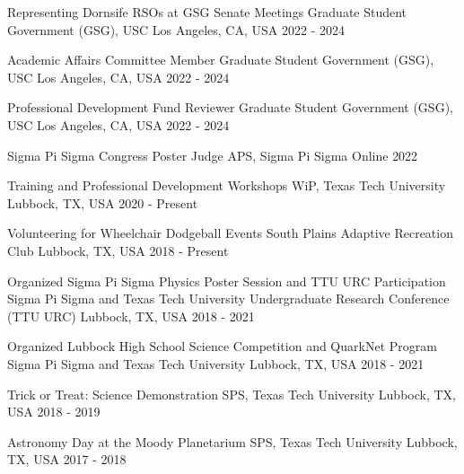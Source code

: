\begin{cvhonors}
    \cvhonor
    {Representing Dornsife RSOs at GSG Senate Meetings}
    {Graduate Student Government (GSG), USC}
    {Los Angeles, CA, USA}
    {2022 - 2024}

    \cvhonor
    {Academic Affairs Committee Member}
    {Graduate Student Government (GSG), USC}
    {Los Angeles, CA, USA}
    {2022 - 2024}

    \cvhonor
    {Professional Development Fund Reviewer}
    {Graduate Student Government (GSG), USC}
    {Los Angeles, CA, USA}
    {2022 - 2024}

    \cvhonor
    {Sigma Pi Sigma Congress Poster Judge}
    {APS, Sigma Pi Sigma}
    {Online}
    {2022}

    \cvhonor
    {Training and Professional Development Workshops}
    {WiP, Texas Tech University}
    {Lubbock, TX, USA}
    {2020 - Present}

    \cvhonor
    {Volunteering for Wheelchair Dodgeball Events}
    {South Plains Adaptive Recreation Club}
    {Lubbock, TX, USA}
    {2018 - Present}

    \cvhonor
    {Organized Sigma Pi Sigma Physics Poster Session and TTU URC Participation}
    {Sigma Pi Sigma and Texas Tech University Undergraduate Research Conference (TTU URC)}
    {Lubbock, TX, USA}
    {2018 - 2021}

    \cvhonor
    {Organized Lubbock High School Science Competition and QuarkNet Program}
    {Sigma Pi Sigma and Texas Tech University}
    {Lubbock, TX, USA}
    {2018 - 2021}

    \cvhonor
    {Trick or Treat: Science Demonstration}
    {SPS, Texas Tech University}
    {Lubbock, TX, USA}
    {2018 - 2019}

    \cvhonor
    {Astronomy Day at the Moody Planetarium}
    {SPS, Texas Tech University}
    {Lubbock, TX, USA}
    {2017 - 2018}

\end{cvhonors}
